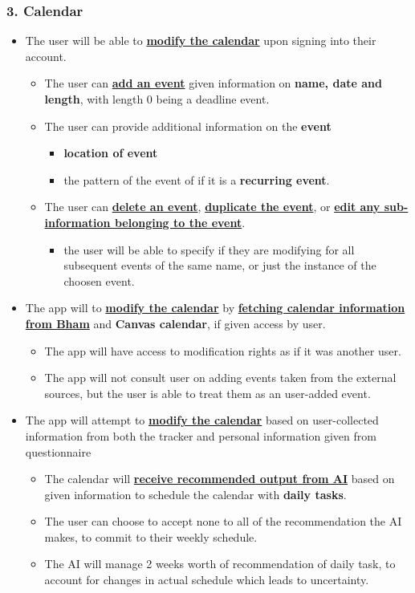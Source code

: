 \documentclass[a4paper,11pt]{article} %
\begin{document}
\subsubsection*{3. Calendar}
\begin{itemize}
  \item The user will be able to \textbf{\ul{modify the calendar}} upon signing into their account.
  \begin{itemize}
    \item The user can \textbf{\ul{add an event}} given information on \textbf{name, date and length}, with length 0 being a deadline event.
    \item The user can provide additional information on the \textbf{event}
    \begin{itemize}
      \item \textbf{location of event}
      \item the pattern of the event of if it is a \textbf{recurring event}.
    \end{itemize}
    \item The user can \textbf{\ul{delete an event}}, \textbf{\ul{duplicate the event}}, or \textbf{\ul{edit any sub-information belonging to the event}}.
    \begin{itemize}
      \item the user will be able to specify if they are modifying for all subsequent events of the same name, or just the instance of the choosen event.
    \end{itemize}
  \end{itemize}
  \item The app will to \textbf{\ul{modify the calendar}} by \textbf{\ul{fetching calendar information from Bham}} and \textbf{Canvas calendar}, if given access by user.
  \begin{itemize}
    \item The app will have access to modification rights as if it was another user.
    \item The app will not consult user on adding events taken from the external sources, but the user is able to treat them as an user-added event.
  \end{itemize}
  \item The app will attempt to \textbf{\ul{modify the calendar}} based on user-collected information from both the tracker and personal information given from questionnaire
  \begin{itemize}
    \item The calendar will \textbf{\ul{receive recommended output from AI}} based on given information to schedule the calendar with \textbf{daily tasks}.
    \item The user can choose to accept none to all of the recommendation the AI makes, to commit to their weekly schedule.
    \item The AI will manage 2 weeks worth of recommendation of daily task, to account for changes in actual schedule which leads to uncertainty.
  \end{itemize}
\end{itemize}
\end{document}
